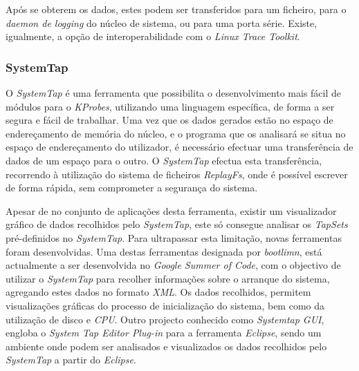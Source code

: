 Após se obterem os dados, estes podem ser transferidos para um ficheiro, para o \textit{daemon de logging} do núcleo de sistema, ou para uma porta série.
Existe, igualmente, a opção de interoperabilidade com o \textit{Linux Trace Toolkit}\cite{DProbes}.

\subsubsection{SystemTap}
O \textit{SystemTap} é uma ferramenta que possibilita o desenvolvimento mais fácil de módulos para o \textit{KProbes}, utilizando uma linguagem específica, de forma a ser segura e fácil de trabalhar.
Uma vez que os dados gerados estão no espaço de endereçamento de memória do núcleo, e o programa que os analisará se situa no espaço de endereçamento do utilizador, é necessário efectuar uma transferência de dados de um espaço para o outro.
O \textit{SystemTap} efectua esta transferência, recorrendo à utilização do sistema de ficheiros \textit{ReplayFs}, onde é possível escrever de forma rápida, sem comprometer a segurança do sistema\cite{Donovan2007,Jones2009}.

Apesar de no conjunto de aplicações desta ferramenta, existir um visualizador gráfico de dados recolhidos pelo \textit{SystemTap}, este só consegue analisar os \textit{TapSets} pré-definidos no \textit{SystemTap}.
Para ultrapassar esta limitação, novas ferramentas foram desenvolvidas.
Uma destas ferramentas designada por \textit{bootlimn}, está actualmente a ser desenvolvida no \textit{Google Summer of Code}, com o objectivo de utilizar o \textit{SystemTap} para recolher informações sobre o arranque do sistema, agregando estes dados no formato \textit{XML}.
Os dados recolhidos, permitem visualizações gráficas do processo de inicialização do sistema, bem como da utilização de disco e \textit{CPU}.
Outro projecto conhecido como \textit{Systemtap GUI}, engloba o \textit{System Tap Editor Plug-in} para a ferramenta \textit{Eclipse}, sendo um ambiente onde podem ser analisados e visualizados os dados recolhidos pelo \textit{SystemTap} a partir do \textit{Eclipse}.






